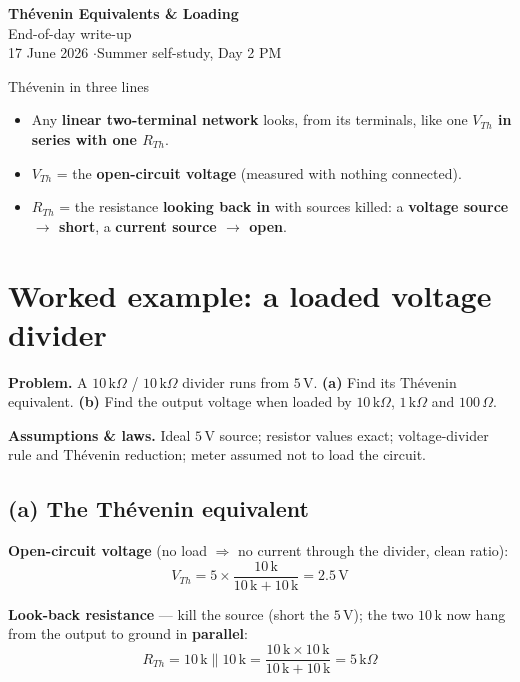 \documentclass[11pt]{article}
\newcommand{\key}[1]{\textbf{#1}}
\begin{document}
\begin{center}
{\LARGE\bfseries Th\'evenin Equivalents \& Loading}\\[2pt]
{\large End-of-day write-up}\\[2pt]
{\small 17 June 2026 \quad$\cdot$\quad Summer self-study, Day 2 PM}
\end{center}

\vspace{4pt}

\begin{concept}{Th\'evenin in three lines}
\begin{itemize}
\item Any \key{linear two-terminal network} looks, from its terminals, like one \key{$V_{Th}$ in series with one $R_{Th}$}.
\item \key{$V_{Th}$} = the \key{open-circuit voltage} (measured with nothing connected).
\item \key{$R_{Th}$} = the resistance \key{looking back in} with sources killed: a \key{voltage source $\to$ short}, a \key{current source $\to$ open}.
\end{itemize}
\end{concept}

\section*{Worked example: a loaded voltage divider}

\textbf{Problem.} A $10\,\mathrm{k}\Omega$ / $10\,\mathrm{k}\Omega$ divider runs from $5\,$V.
\textbf{(a)} Find its Th\'evenin equivalent.
\textbf{(b)} Find the output voltage when loaded by $10\,\mathrm{k}\Omega$, $1\,\mathrm{k}\Omega$ and $100\,\Omega$.

\smallskip
\textbf{Assumptions \& laws.} Ideal $5\,$V source; resistor values exact; voltage-divider rule and Th\'evenin reduction; meter assumed not to load the circuit.

\subsection*{(a) The Th\'evenin equivalent}

\textbf{Open-circuit voltage} (no load $\Rightarrow$ no current through the divider, clean ratio):
\[
V_{Th} = 5 \times \frac{10\,\mathrm{k}}{10\,\mathrm{k}+10\,\mathrm{k}} = 2.5\,\text{V}
\]

\textbf{Look-back resistance} --- kill the source (short the $5\,$V); the two $10\,\mathrm{k}$ now hang from the output to ground in \key{parallel}:
\[
R_{Th} = 10\,\mathrm{k} \parallel 10\,\mathrm{k} = \frac{10\,\mathrm{k}\times 10\,\mathrm{k}}{10\,\mathrm{k}+10\,\mathrm{k}} = 5\,\mathrm{k}\Omega
\]
\end{document}
